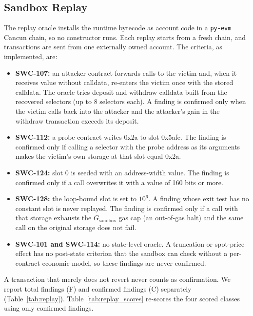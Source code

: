 \documentclass[pdflatex,sn-mathphys]{sn-jnl}
\theoremstyle{thmstyleone}
\theoremstyle{thmstyletwo}
\begin{document}
\subsection{Sandbox Replay}\label{sec:arch:oracle}
The replay oracle installs the runtime bytecode as account code in a \texttt{py-evm} Cancun chain, so no constructor runs. Each replay starts from a fresh chain, and transactions are sent from one externally owned account. The criteria, as implemented, are:
\begin{itemize}
    \item \textbf{SWC-107:} an attacker contract forwards calls to the victim and, when it receives value without calldata, re-enters the victim once with the stored calldata. The oracle tries deposit and withdraw calldata built from the recovered selectors (up to 8 selectors each). A finding is confirmed only when the victim calls back into the attacker and the attacker's gain in the withdraw transaction exceeds its deposit.
    \item \textbf{SWC-112:} a probe contract writes 0x2a to slot 0x5afe. The finding is confirmed only if calling a selector with the probe address as its arguments makes the victim's own storage at that slot equal 0x2a.
    \item \textbf{SWC-124:} slot 0 is seeded with an address-width value. The finding is confirmed only if a call overwrites it with a value of 160 bits or more.
    \item \textbf{SWC-128:} the loop-bound slot is set to $10^6$. A finding whose exit test has no constant slot is never replayed. The finding is confirmed only if a call with that storage exhausts the $G_{\mathrm{sandbox}}$ gas cap (an out-of-gas halt) and the same call on the original storage does not fail.
    \item \textbf{SWC-101 and SWC-114:} no state-level oracle. A truncation or spot-price effect has no post-state criterion that the sandbox can check without a per-contract economic model, so these findings are never confirmed.
\end{itemize}
A transaction that merely does not revert never counts as confirmation. We report total findings (F) and confirmed findings (C) separately (Table~\ref{tab:replay}). Table~\ref{tab:replay_scores} re-scores the four scored classes using only confirmed findings.
\end{document}
